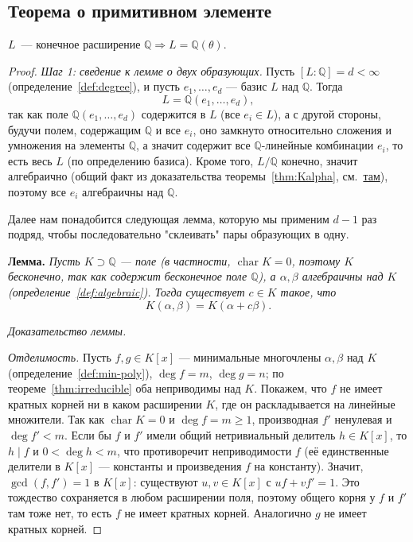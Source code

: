 \documentclass[12pt]{article}
\begin{document}
    \subsection{Теорема о примитивном элементе}
    
    \begin{theorem}\label{thm:primitive-element}
    	$L$~--- конечное расширение $\mathbb{Q} \Rightarrow L = \mathbb{Q}(\theta)$.
    \end{theorem}
    \begin{proof}
    	\emph{Шаг 1: сведение к лемме о двух образующих.} Пусть $[L:\mathbb{Q}] = d < \infty$ (определение~\ref{def:degree}), и пусть $e_1,\ldots,e_d$ --- базис $L$ над $\mathbb{Q}$. Тогда
    	\[
    	L = \mathbb{Q}(e_1,\ldots,e_d),
    	\]
    	так как поле $\mathbb{Q}(e_1,\ldots,e_d)$ содержится в $L$ (все $e_i \in L$), а с другой стороны, будучи полем, содержащим $\mathbb{Q}$ и все $e_i$, оно замкнуто относительно сложения и умножения на элементы $\mathbb{Q}$, а значит содержит все $\mathbb{Q}$-линейные комбинации $e_i$, то есть весь $L$ (по определению базиса). Кроме того, $L/\mathbb{Q}$ конечно, значит алгебраично (общий факт из доказательства теоремы~\ref{thm:Kalpha}, см.~\hyperref[lem:finite-algebraic]{там}), поэтому все $e_i$ алгебраичны над $\mathbb{Q}$.
    
    	Далее нам понадобится следующая лемма, которую мы применим $d-1$ раз подряд, чтобы последовательно "склеивать" пары образующих в одну.
    
    	\smallskip
    	\noindent\textbf{Лемма.} \emph{Пусть $K \supset \mathbb{Q}$ --- поле (в частности, $\operatorname{char} K = 0$, поэтому $K$ бесконечно, так как содержит бесконечное поле $\mathbb{Q}$), а $\alpha,\beta$ алгебраичны над $K$ (определение~\ref{def:algebraic}). Тогда существует $c \in K$ такое, что}
    	\[
    	K(\alpha,\beta) = K(\alpha + c\beta).
    	\]
    
    	\emph{Доказательство леммы.}
    
    	\emph{Отделимость.} Пусть $f, g \in K[x]$ --- минимальные многочлены $\alpha, \beta$ над $K$ (определение~\ref{def:min-poly}), $\deg f = m$, $\deg g = n$; по теореме~\ref{thm:irreducible} оба неприводимы над $K$. Покажем, что $f$ не имеет кратных корней ни в каком расширении $K$, где он раскладывается на линейные множители. Так как $\operatorname{char} K = 0$ и $\deg f = m \geqslant 1$, производная $f'$ ненулевая и $\deg f' < m$. Если бы $f$ и $f'$ имели общий нетривиальный делитель $h \in K[x]$, то $h \mid f$ и $0 < \deg h < m$, что противоречит неприводимости $f$ (её единственные делители в $K[x]$ --- константы и произведения $f$ на константу). Значит, $\gcd(f,f')=1$ в $K[x]$: существуют $u,v \in K[x]$ с $uf+vf'=1$. Это тождество сохраняется в любом расширении поля, поэтому общего корня у $f$ и $f'$ там тоже нет, то есть $f$ не имеет кратных корней. Аналогично $g$ не имеет кратных корней.
    

\end{proof}
\end{document}
